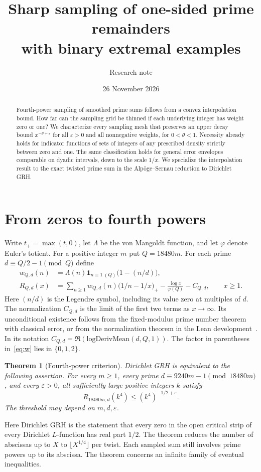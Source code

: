 \documentclass[11pt]{article}
\title{Sharp sampling of one-sided prime remainders\texorpdfstring{\\}{ }with binary extremal examples}
\author{Research note}
\date{26 November 2026}
\newtheorem{theorem}{Theorem}
\newcommand{\eps}{\varepsilon}
\newcommand{\pos}[1]{\bigl(#1\bigr)_{+}}
\newcommand{\one}{\mathbf{1}}
\begin{document}
\maketitle
\begin{abstract}
Fourth-power sampling of smoothed prime sums follows from a convex interpolation bound. How far can the sampling grid be thinned if each underlying integer has weight zero or one? We characterize every sampling mesh that preserves an upper decay bound $x^{-\theta+\eps}$ for all $\eps>0$ and all nonnegative weights, for $0<\theta<1$. Necessity already holds for indicator functions of sets of integers of any prescribed density strictly between zero and one. The same classification holds for general error envelopes comparable on dyadic intervals, down to the scale $1/x$. We specialize the interpolation result to the exact twisted prime sum in the Alp\"oge--Sernau reduction to Dirichlet GRH.
\end{abstract}

\section{From zeros to fourth powers}
Write $t_+=\max(t,0)$, let $\Lambda$ be the von Mangoldt function, and let $\varphi$ denote Euler's totient. For a positive integer $m$ put $Q=18480m$. For each prime $d\equiv Q/2-1\pmod Q$ define
\begin{align}
 w_{Q,d}(n)&=\Lambda(n)\one_{n\equiv1\ (Q)}\bigl(1-(n/d)\bigr),\label{eq:w}\\
 R_{Q,d}(x)&=\sum_{n\ge1}w_{Q,d}(n)\pos{1/n-1/x}
       -\frac{\log x}{\varphi(Q)}-C_{Q,d},\qquad x\ge1.\label{eq:R}
\end{align}
Here $(n/d)$ is the Legendre symbol, including its value zero at multiples of $d$. The normalization $C_{Q,d}$ is the limit of the first two terms as $x\to\infty$. Its unconditional existence follows from the fixed-modulus prime number theorem with classical error, or from the normalization theorem in the Lean development~\cite{grh}. In its notation $C_{Q,d}=\Re(\mathrm{logDerivMean}(d,Q,1))$. The factor in parentheses in~\eqref{eq:w} lies in $\{0,1,2\}$.

\begin{theorem}[Fourth-power criterion]\label{t:quartic}
Dirichlet GRH is equivalent to the following assertion. For every $m\ge1$, every prime $d\equiv 9240m-1\pmod{18480m}$, and every $\eps>0$, all sufficiently large positive integers $k$ satisfy
\[
 R_{18480m,d}(k^4)\le (k^4)^{-1/2+\eps}.
\]
The threshold may depend on $m,d,\eps$.
\end{theorem}
Here Dirichlet GRH is the statement that every zero in the open critical strip of every Dirichlet $L$-function has real part $1/2$. The theorem reduces the number of abscissas up to $X$ to $\lfloor X^{1/4}\rfloor$ per twist. Each sampled sum still involves prime powers up to its abscissa. The theorem concerns an infinite family of eventual inequalities.
\end{document}
